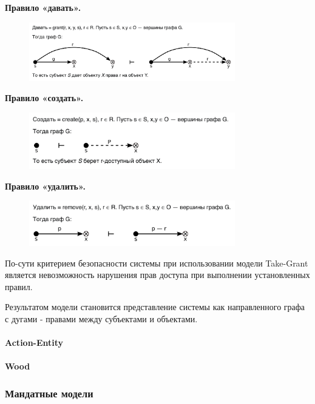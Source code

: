 \textbf{Правило «давать».}
\begin{figure}[H]
    \centering
    \includegraphics[width=0.8\textwidth]{assets/models/take_grant_give.png}
\end{figure}

\textbf{Правило «создать».}
\begin{figure}[H]
    \centering
    \includegraphics[width=0.8\textwidth]{assets/models/take_grant_create.png}
\end{figure}

\textbf{Правило «удалить».}
\begin{figure}[H]
    \centering
    \includegraphics[width=0.8\textwidth]{assets/models/take_grant_delete.png}
\end{figure}

По-сути критерием безопасности системы при использовании модели Take-Grant является невозможность нарушения 
прав доступа при выполнении установленных правил.

Результатом модели становится представление системы как направленного графа с дугами - правами между субъектами 
и объектами.

\paragraph{Action-Entity}
\paragraph{Wood}

\subsubsection{Мандатные модели}

